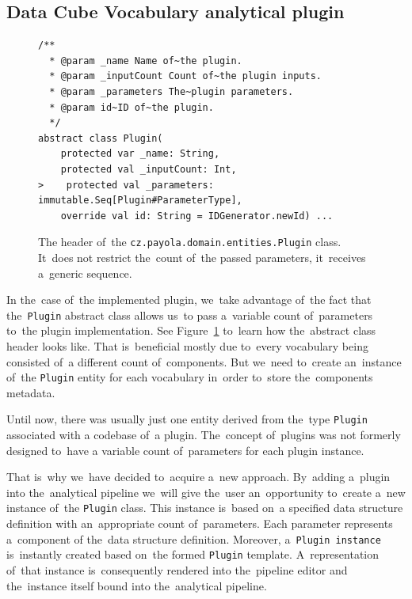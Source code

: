 \subsection{Data Cube Vocabulary analytical plugin}

\begin{figure}
  \begin{verbatim}
/**
  * @param _name Name of~the plugin.
  * @param _inputCount Count of~the plugin inputs.
  * @param _parameters The~plugin parameters.
  * @param id~ID of~the plugin.
  */
abstract class Plugin(
    protected var _name: String,
    protected val _inputCount: Int,
>    protected val _parameters: immutable.Seq[Plugin#ParameterType],
    override val id: String = IDGenerator.newId) ...
  \end{verbatim}
  \caption{The header of~the \texttt{cz.payola.domain.entities.Plugin} class. It~does not restrict the~count
  of~the passed parameters, it~receives a~generic sequence.}
  \label{fig:plugin-trait-code}
\end{figure}

In the~case of~the implemented plugin, we~take advantage of~the fact that the~\texttt{Plugin} abstract class allows us~to pass a~variable count of~parameters to~the 
plugin implementation. See Figure~\ref{fig:plugin-trait-code} to~learn how the~abstract class header 
looks like. That is~beneficial mostly due to~every vocabulary being consisted of~a 
different count of~components. But we~need to~create an~instance of~the \texttt{Plugin} entity
for each vocabulary in~order to~store the~components metadata.

Until now, there was usually just one entity derived from the~type \texttt{Plugin} associated with
a codebase of~a plugin. The~concept of~plugins was not formerly designed to~have
a variable count of~parameters for each plugin instance.

That is~why we~have decided to~acquire a~new approach. By~adding a~plugin 
into the~analytical pipeline we~will give the~user an~opportunity to~create a~new instance of~the \texttt{Plugin} class. This instance is~based on~a specified data structure definition
with an~appropriate count of~parameters. Each parameter represents a~component 
of the~data structure definition. Moreover, a~\texttt{Plugin instance} is~instantly created 
based on~the formed \texttt{Plugin} template. A~representation of~that instance is~consequently 
rendered into the~pipeline editor and the~instance itself bound into the~analytical pipeline.

